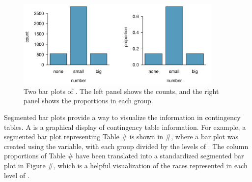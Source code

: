 \begin{doublespace}
\begin{figure}[bht]
	\centering
	\includegraphics[width=0.9\textwidth]{ch_intro_to_data_oi_biostat/figures/emailNumberBarPlot/emailNumberBarPlot}
	\caption{Two bar plots of . The left panel shows the counts, and the right panel shows the proportions in each group.}
	\label{emailNumberBarPlot}
\end{figure}


Segmented bar plots provide a way to visualize the information in contingency tables. A  is a graphical display of contingency table information. For example, a segmented bar plot representing Table \# is shown in \#, where a bar plot was created using the  variable, with each group divided by the levels of . The column proportions of Table \# have been translated into a standardized segmented bar plot in Figure \#, which is a helpful visualization of the races represented in each level of .


\end{doublespace}
